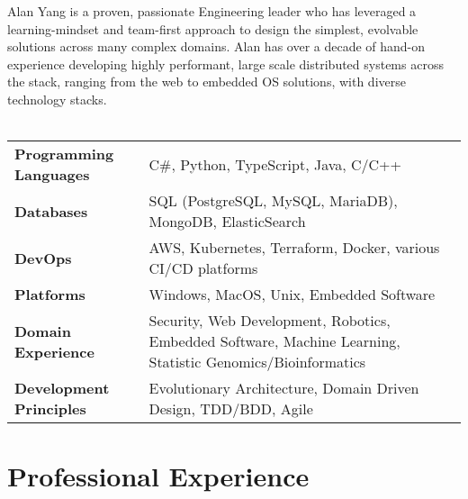 \documentclass[line]{res}
\begin{document}
 


\begin{resume} 
Alan Yang is a proven, passionate Engineering leader who has leveraged a learning-mindset and team-first approach to design the simplest, evolvable solutions across many complex domains. Alan has over a decade of hand-on experience developing highly performant, large scale distributed systems across the stack, ranging from the web to embedded OS solutions, with diverse technology stacks. \\\\
\begin{tabular}{ l | p{13cm}}
{\bf Programming Languages} & C\#, Python, TypeScript, Java, C/C++ \\[1pt]
{\bf Databases} & SQL (PostgreSQL, MySQL, MariaDB), MongoDB, ElasticSearch \\[1pt]
{\bf DevOps} & AWS, Kubernetes, Terraform, Docker, various CI/CD platforms \\[1pt]
{\bf Platforms} & Windows, MacOS, Unix, Embedded Software \\[1pt]
{\bf Domain Experience } & Security, Web Development, Robotics, Embedded Software, Machine Learning, Statistic Genomics/Bioinformatics \\[1pt]
{\bf Development Principles} & Evolutionary Architecture, Domain Driven Design, TDD/BDD, Agile \\[1pt]
\end{tabular}

\vspace{0.1in} 
\section{{Professional Experience}} 
\vspace{8pt}


\end{resume}
\end{document}
